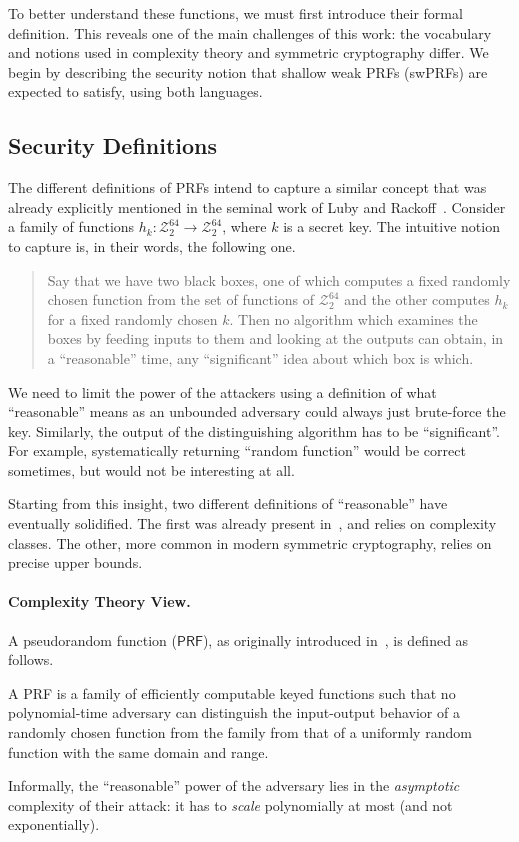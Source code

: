 \documentclass[journal=tosc,submission]{iacrtrans}
\theoremstyle{theorem}
\newcommand\PRF{\ensuremath{\mathsf{PRF}}\xspace}
\newcommand\Z{\mathcal{Z}}
\begin{document}
To better understand these functions, we must first introduce their formal definition. This reveals one of the main challenges of this work: the vocabulary and notions used in complexity theory and symmetric cryptography differ. We begin by describing the security notion that shallow weak PRFs (swPRFs) are expected to satisfy, using both languages.



\subsection{Security Definitions}

The different definitions of PRFs intend to capture a similar concept that was already explicitly mentioned in the seminal work of Luby and Rackoff~\cite{LubRac88}. Consider a family of functions $h_k : \Z_2^{64} \to \Z_2^{64}$, where $k$ is a secret key. The intuitive notion to capture is, in their words, the following one.
\begin{quote}
  Say that we have two black boxes, one of which computes a fixed randomly chosen
function from the set of functions of $\Z_2^{64}$ and the other computes $h_k$ for a fixed randomly chosen $k$.
Then no algorithm which examines the boxes by feeding inputs to them and
looking at the outputs can obtain, in a ``reasonable'' time, any ``significant'' idea
about which box is which.
\end{quote}
We need to limit the power of the attackers using a definition of what ``reasonable'' means as an unbounded adversary could always just brute-force the key. Similarly, the output of the distinguishing algorithm has to be ``significant''. For example, systematically returning ``random function'' would be correct sometimes, but would not be interesting at all.

Starting from this insight, two different definitions of ``reasonable'' have eventually solidified. The first was already present in~\cite{LubRac88}, and relies on complexity classes. The other, more common in modern symmetric cryptography, relies on precise upper bounds.

\paragraph{Complexity Theory View.}

A pseudorandom function (\PRF), as originally introduced in~\cite{FOCS:GolGolMic84}, is defined as follows.
\begin{definition}
  A PRF is a family of efficiently computable keyed functions such that no polynomial-time adversary can distinguish the input-output behavior of a randomly chosen function from the family from that of a uniformly random function with the same domain and range.  
\end{definition}
Informally, the ``reasonable'' power of the adversary lies in the \emph{asymptotic} complexity of their attack: it has to \emph{scale} polynomially at most (and not exponentially).
\end{document}
